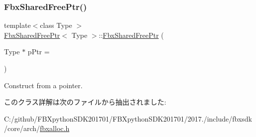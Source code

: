 \subsubsection{\texorpdfstring{Fbx\+Shared\+Free\+Ptr()}{FbxSharedFreePtr()}}
{\footnotesize\ttfamily template$<$class Type $>$ \\
\hyperlink{class_fbx_shared_free_ptr}{Fbx\+Shared\+Free\+Ptr}$<$ Type $>$\+::\hyperlink{class_fbx_shared_free_ptr}{Fbx\+Shared\+Free\+Ptr} (\begin{DoxyParamCaption}\item[{Type $\ast$}]{p\+Ptr = {} }\end{DoxyParamCaption})\hspace{0.3cm}{\ttfamily [explicit]}}



Construct from a pointer. 



このクラス詳解は次のファイルから抽出されました\+:\begin{DoxyCompactItemize}
\item 
C\+:/github/\+F\+B\+Xpython\+S\+D\+K201701/\+F\+B\+Xpython\+S\+D\+K201701/2017./include/fbxsdk/core/arch/\hyperlink{fbxalloc_8h}{fbxalloc.\+h}\end{DoxyCompactItemize}
